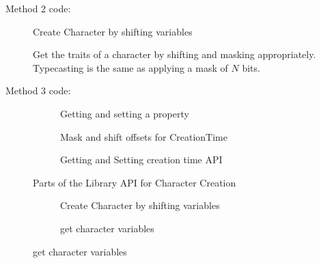 \begin{appendices}
Method 2 code:

\begin{figure}[H]
    \centering
    
    \caption{Create Character by shifting variables}
    \label{fig:uint_encoding_code}
\end{figure}

\begin{figure}[H] 
    \centering
    
    \caption{Get the traits of a character by shifting and masking appropriately. Typecasting is the same as applying a mask of $N$ bits.}
    \label{fig:uint_decoding_code}
\end{figure}

Method 3 code:

\begin{figure}[H]
  \begin{subfigure}[b]{\textwidth}
    \centering
    
    \caption{Getting and setting a property}
  \end{subfigure}
  \begin{subfigure}[b]{\textwidth}
    \centering
    
    \caption{Mask and shift offsets for CreationTime}
  \end{subfigure}
  \begin{subfigure}[b]{\textwidth}
    \centering
    
    \caption{Getting and Setting creation time API}
  \end{subfigure}
  \caption{Parts of the Library API for Character Creation}
  \label{apx:scalability:lib}
\end{figure}

\begin{figure}[H]
    \begin{subfigure}[b]{0.5\textwidth}
        \centering
        
        \caption{Create Character by shifting variables}
        \label{fig:bytes_encoding_code}
    \end{subfigure}
    \begin{subfigure}[b]{0.5\textwidth}
        \centering
        
        \caption{get character variables}
        \label{fig:bytes_decoding_code}
    \end{subfigure}
\end{figure}


\end{appendices}
